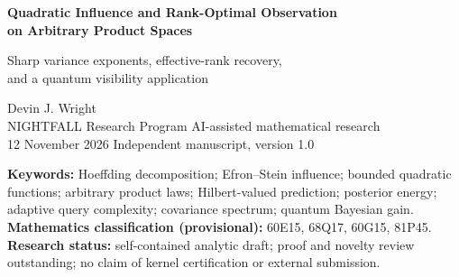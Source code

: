 \documentclass[11pt,letterpaper]{article}
\theoremstyle{definition}
\newcommand{\E}{\mathbb E}
\newcommand{\Var}{\operatorname{Var}}
\newcommand{\Inf}{\operatorname{I}}
\begin{document}
\begin{center}
{\Large\bfseries Quadratic Influence and Rank-Optimal Observation\\[2pt] on Arbitrary Product Spaces\par}
\vspace{7pt}
{\large Sharp variance exponents, effective-rank recovery,\\ and a quantum visibility application\par}
\vspace{12pt}
{Devin J. Wright}\\[3pt]
{NIGHTFALL Research Program \quad\textbar\quad AI-assisted mathematical research}\\[5pt]
{12 November 2026 \quad\textbar\quad Independent manuscript, version 1.0}
\end{center}
\begin{abstract}
We prove a dimension-free influence inequality for bounded real observables of
Hoeffding interaction degree at most two on arbitrary independent product
probability spaces. If $|f|\le B$, $V=\Var(f)>0$, and
$\Inf_i(f)=\E\Var(f\mid X_{-i})$, then
\[\max_i\Inf_i(f)\ge \frac{V^2}{C_2B^2},\qquad
 C_2=(10+2\sqrt2)^2(1+\sqrt3)^2<1229.\]
The exponent of $V$ is optimal. The proof is self-contained and uses a
matching-based coupling budget, boundedness-derived coordinate oscillation
budgets, and fourth-moment interpolation for independent Hilbert-valued
interaction increments; in particular, it does not invoke Turturean's theorem
or any result derived from it. For an output of effective covariance rank $r$
we establish $V(F)^2\le3C_2rB^2\max_i\Inf_i(F)$ and an adaptive whole-coordinate
observation procedure achieving risk at most $\tau_r(F)+\eta$ in at most
$\min\{n,\lceil12C_2rB^2/\eta\rceil\}$ observations, where $\tau_r$ is the
covariance spectral tail. This gives a spectrum-adaptive bound with matching
worst-case order in rank and accuracy; an addressing construction separates
adaptive from nonadaptive observation by an unbounded factor. We include
conditional operational consequences for one-query quantum probability
vectors and for Bayesian measurement of locally encoded registers, explicitly
distinguishing classical whole-symbol reads from quantum measurements.
The written arguments are analytic proofs, not Lean-checked declarations;
independent referee review and worldwide originality adjudication are open.
\end{abstract}
\noindent\textbf{Keywords:} Hoeffding decomposition; Efron--Stein influence;
bounded quadratic functions; arbitrary product laws; Hilbert-valued prediction;
posterior energy; adaptive query complexity; covariance spectrum; quantum Bayesian gain.\\
\textbf{Mathematics classification (provisional):} 60E15, 68Q17, 60G15, 81P45.\\
\textbf{Research status:} self-contained analytic draft; proof and novelty review outstanding; no claim of kernel certification or external submission.
\end{document}
